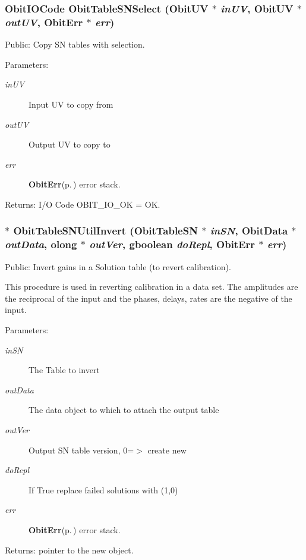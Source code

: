 \subsubsection{\setlength{\rightskip}{0pt plus 5cm}Obit\-IOCode Obit\-Table\-SNSelect ({\bf Obit\-UV} $\ast$ {\em in\-UV}, {\bf Obit\-UV} $\ast$ {\em out\-UV}, {\bf Obit\-Err} $\ast$ {\em err})}\label{ObitTableSNUtil_8h_a0}


Public: Copy SN tables with selection. 

\begin{Desc}
\item[Parameters:]
\begin{description}
\item[{\em in\-UV}]Input UV to copy from \item[{\em out\-UV}]Output UV to copy to \item[{\em err}]{\bf Obit\-Err}{\rm (p.\,\pageref{structObitErr})} error stack. \end{description}
\end{Desc}
\begin{Desc}
\item[Returns:]I/O Code OBIT\_\-IO\_\-OK = OK. \end{Desc}
\subsubsection{$\ast$ Obit\-Table\-SNUtil\-Invert ({\bf Obit\-Table\-SN} $\ast$ {\em in\-SN}, {\bf Obit\-Data} $\ast$ {\em out\-Data}, {\bf olong} $\ast$ {\em out\-Ver}, gboolean {\em do\-Repl}, {\bf Obit\-Err} $\ast$ {\em err})}\label{ObitTableSNUtil_8h_a1}


Public: Invert gains in a Solution table (to revert calibration). 

This procedure is used in reverting calibration in a data set. The amplitudes are the reciprocal of the input and the phases, delays, rates are the negative of the input. \begin{Desc}
\item[Parameters:]
\begin{description}
\item[{\em in\-SN}]The Table to invert \item[{\em out\-Data}]The data object to which to attach the output table \item[{\em out\-Ver}]Output SN table version, 0=$>$ create new \item[{\em do\-Repl}]If True replace failed solutions with (1,0) \item[{\em err}]{\bf Obit\-Err}{\rm (p.\,\pageref{structObitErr})} error stack. \end{description}
\end{Desc}
\begin{Desc}
\item[Returns:]pointer to the new object. \end{Desc}
